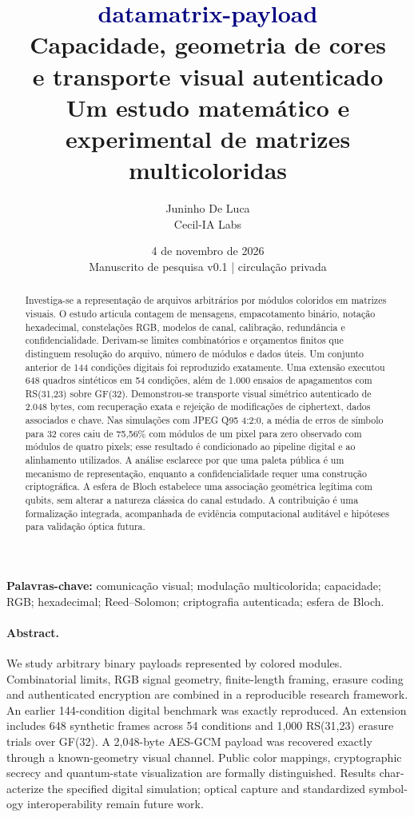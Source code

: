 \documentclass[11pt,a4paper]{article}
\title{\textcolor{navy}{\textbf{datamatrix-payload}}\\[5pt]
Capacidade, geometria de cores\\e transporte visual autenticado\\[7pt]
\large Um estudo matemático e experimental de matrizes multicoloridas}
\author{Juninho De Luca\\\small Cecil-IA Labs}
\date{4 de novembro de 2026\\\small Manuscrito de pesquisa v0.1 | circulação privada}
\begin{document}
\maketitle
\begin{abstract}
Investiga-se a representação de arquivos arbitrários por módulos coloridos em matrizes visuais. O estudo articula contagem de mensagens, empacotamento binário, notação hexadecimal, constelações RGB, modelos de canal, calibração, redundância e confidencialidade. Derivam-se limites combinatórios e orçamentos finitos que distinguem resolução do arquivo, número de módulos e dados úteis. Um conjunto anterior de 144 condições digitais foi reproduzido exatamente. Uma extensão executou 648 quadros sintéticos em 54 condições, além de 1.000 ensaios de apagamentos com RS(31,23) sobre GF(32). Demonstrou-se transporte visual simétrico autenticado de 2.048 bytes, com recuperação exata e rejeição de modificações de ciphertext, dados associados e chave. Nas simulações com JPEG Q95 4:2:0, a média de erros de símbolo para 32 cores caiu de 75,56\% com módulos de um pixel para zero observado com módulos de quatro pixels; esse resultado é condicionado ao pipeline digital e ao alinhamento utilizados. A análise esclarece por que uma paleta pública é um mecanismo de representação, enquanto a confidencialidade requer uma construção criptográfica. A esfera de Bloch estabelece uma associação geométrica legítima com qubits, sem alterar a natureza clássica do canal estudado. A contribuição é uma formalização integrada, acompanhada de evidência computacional auditável e hipóteses para validação óptica futura.
\end{abstract}
\textbf{Palavras-chave:} comunicação visual; modulação multicolorida; capacidade; RGB; hexadecimal; Reed--Solomon; criptografia autenticada; esfera de Bloch.

\begin{otherlanguage}{english}
\paragraph{Abstract.}
We study arbitrary binary payloads represented by colored modules. Combinatorial limits, RGB signal geometry, finite-length framing, erasure coding and authenticated encryption are combined in a reproducible research framework. An earlier 144-condition digital benchmark was exactly reproduced. An extension includes 648 synthetic frames across 54 conditions and 1,000 RS(31,23) erasure trials over GF(32). A 2,048-byte AES-GCM payload was recovered exactly through a known-geometry visual channel. Public color mappings, cryptographic secrecy and quantum-state visualization are formally distinguished. Results characterize the specified digital simulation; optical capture and standardized symbology interoperability remain future work.
\end{otherlanguage}
\newpage
\setcounter{tocdepth}{1}
\tableofcontents
\newpage
\end{document}
